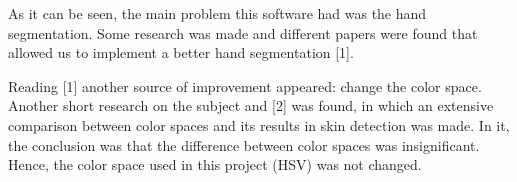 As it can be seen, the main problem this software had was the hand segmentation. Some research was made and different papers were found that allowed us to implement a better hand segmentation [1].

Reading [1] another source of improvement appeared: change the color space. Another short research on the subject and [2] was found,  in which an extensive comparison between color spaces and its results in skin detection was made. In it, the conclusion was that the difference between color spaces was insignificant. Hence, the color space used in this project (HSV) was not changed. 
